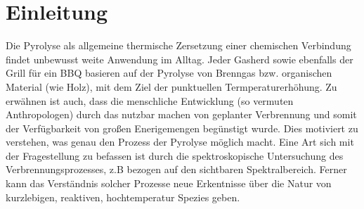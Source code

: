 %
%

\section{Einleitung}
Die Pyrolyse als allgemeine thermische Zersetzung einer chemischen Verbindung findet unbewusst weite Anwendung im Alltag. Jeder Gasherd sowie ebenfalls der Grill für ein BBQ basieren auf der Pyrolyse von Brenngas bzw. organischen Material (wie Holz), mit dem Ziel der punktuellen Termperaturerhöhung. Zu erwähnen ist auch, dass die menschliche Entwicklung (so vermuten Anthropologen) durch das nutzbar machen von geplanter Verbrennung und somit der Verfügbarkeit von großen Enerigemengen begünstigt wurde. Dies motiviert zu verstehen, was genau den Prozess der Pyrolyse möglich macht. Eine Art sich mit der Fragestellung zu befassen ist durch die spektroskopische Untersuchung des Verbrennungsprozesses, z.B bezogen auf den sichtbaren Spektralbereich. Ferner kann das Verständnis solcher Prozesse neue Erkentnisse über die Natur von kurzlebigen, reaktiven, hochtemperatur Spezies geben.  
%
